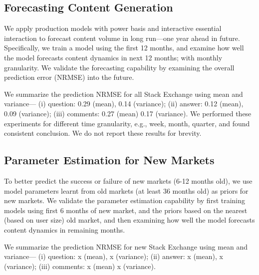 \subsection{Forecasting Content Generation} 
We apply production models with power basis and interactive essential interaction to forecast content volume in long run---one year ahead in future. Specifically, we train a model using the first 12 months, and examine how well the model forecasts content dynamics in next 12 months; with monthly granularity. We validate the forecasting capability by examining the overall prediction error (NRMSE) into the future. 

We summarize the prediction NRMSE for all Stack Exchange using mean and variance--- (i) question: 0.29 (mean), 0.14 (variance); (ii) answer: 0.12 (mean), 0.09 (variance); (iii) comments: 0.27 (mean) 0.17 (variance). We performed these experiments for different time granularity, e.g., week, month, quarter, and found consistent conclusion. We do not report these results for brevity.

\subsection{Parameter Estimation for New Markets} 
To better predict the success or failure of new markets (6-12 months old), we use model parameters learnt from old markets (at least 36 months old) as priors for new markets. We validate the parameter estimation capability by first training models using first 6 months of new market, and the priors based on the nearest (based on user size) old market, and then examining how well the model forecasts content dynamics in remaining months. 

We summarize the prediction NRMSE for new Stack Exchange using mean and variance--- (i) question: x (mean), x (variance); (ii) answer: x (mean), x (variance); (iii) comments: x (mean) x (variance).

